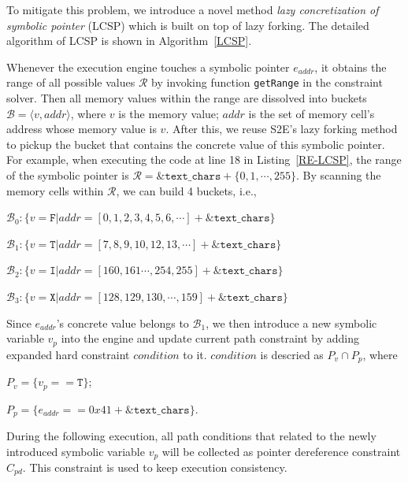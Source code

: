 \documentclass{cta-author}
\begin{document}
To mitigate this problem, we introduce a novel method 
\emph{lazy concretization of symbolic pointer} (LCSP) 
which is built on top of lazy forking. The detailed algorithm 
of LCSP is shown in Algorithm~\ref{LCSP}.


 

Whenever the execution engine touches a symbolic pointer $e_{addr}$, it obtains 
the range of all possible values $\mathcal{R}$ by invoking function \texttt{getRange} 
in the constraint solver. Then all memory values within the range are dissolved
into buckets $\mathcal{B}=\langle v, addr\rangle$, where $v$ is the memory value; $addr$
is the set of memory cell's address whose memory value is $v$.
After this, we reuse S2E's lazy forking method to pickup 
the bucket that contains the concrete value of this symbolic pointer.
For example, when executing the code at line 18 in Listing~\ref{RE-LCSP}, the range of 
the symbolic pointer is $\mathcal{R}=\texttt{\&text\_chars}+\{0, 1,\cdots, 255\}$.
By scanning the memory cells within $\mathcal{R}$, we can build 4 buckets, i.e., 

$\mathcal{B}_0:\{v=\texttt{F}| addr=[0,1,2,3,4,5,6,\cdots]+\texttt{\&text\_chars}\}$

$\mathcal{B}_1:\{v=\texttt{T}| addr=[7,8,9,10,12,13,\cdots]+\texttt{\&text\_chars}\}$

$\mathcal{B}_2:\{v=\texttt{I}| addr=[160,161\cdots,254,255]+\texttt{\&text\_chars}\}$

$\mathcal{B}_3:\{v=\texttt{X}| addr=[128,129,130,\cdots,159]+\texttt{\&text\_chars}\}$

Since $e_{addr}$'s concrete value belongs to $\mathcal{B}_1$, we then
introduce a new symbolic variable $v_p$ into the engine and update current path constraint by adding expanded hard constraint $condition$ to it. 
$condition$ is descried as $P_v\cap P_p$, where

$P_v=\{v_p==\texttt{T}\}$; 

$P_p=\{e_{addr}==0x41+\&\texttt{text\_chars}\}$.

During the following execution, all path conditions that related to the newly
introduced symbolic variable $v_p$ will be collected as pointer dereference constraint
$C_{pd}$.
This constraint is used to keep execution consistency.
\end{document}
